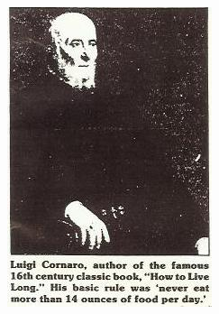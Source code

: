 \documentclass[12pt,letterpaper]{article}
\begin{document}
\begin{figure}
  \centering
  \includegraphics[width=\textwidth]{luigi.jpg}
\end{figure}


\newpage\thispagestyle{empty}
\end{document}
